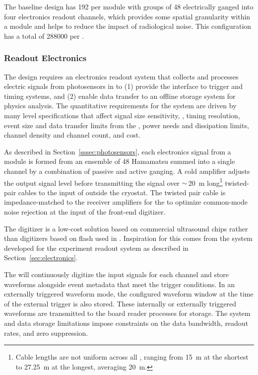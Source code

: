 The baseline  design has \num{192} %
 per  module with groups of \num{48}  electrically ganged into four electronics readout channels, which provides some spatial granularity within a module and helps to reduce the impact of radiological noise. This configuration has a total of \num{288000}  per . 


\subsubsection{Readout Electronics} 

The  design requires an electronics readout system that collects and processes electric signals from photosensors in  to (1) provide the interface to trigger and timing systems,
and (2) enable data transfer to an offline storage system for physics analysis. The quantitative requirements for the system are driven by many  level specifications that affect signal size sensitivity, , timing resolution, event size and data transfer limits from the , power needs and dissipation limits, channel density and channel count, and cost. 

As described in Section~\ref{sssec:photosensors}, each electronics signal from a  module is formed from an ensemble of 48 Hamamatsu  summed into a single channel by a combination of passive and active ganging.  A cold amplifier adjusts the  output signal level before transmitting the signal over $\sim\,$\SI{20}{m} long\footnote{Cable lengths are not uniform across all , ranging from \SI{15}{m} at the shortest to \SI{27.25}{m} at the longest, averaging \SI{20}{m}.} twisted-pair cables to the input of   outside the cryostat.  The twisted pair cable is impedance-matched to  the receiver amplifiers for the  to optimize common-mode noise rejection at the input of the front-end digitizer. 

The digitizer is a low-cost solution based on commercial ultrasound  chips rather than digitizers based on flash  used in . Inspiration for this  comes from the system developed for the  experiment  readout system as described in Section~\ref{sec:electronics}.

The  will continuously digitize the input signals for each channel and store waveforms alongside event metadata that meet the trigger conditions. In an externally triggered waveform mode, the configured waveform window at the time of the external trigger is also stored. These internally or externally triggered waveforms are transmitted to the  board reader processes for storage. The  system and data storage limitations impose constraints on the data bandwidth, readout rates, and zero suppression. 

